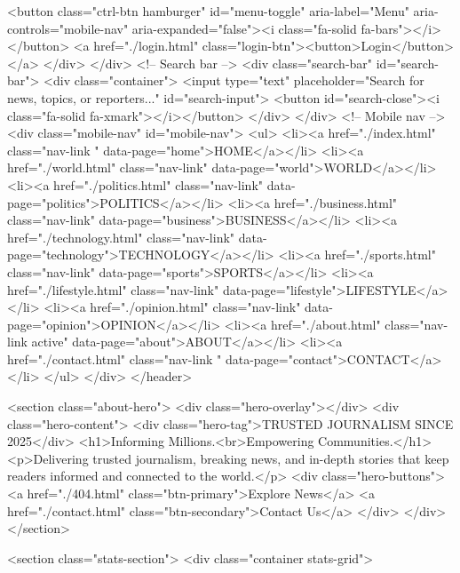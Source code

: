                 <button class="ctrl-btn hamburger" id="menu-toggle" aria-label="Menu" aria-controls="mobile-nav"
                    aria-expanded="false"><i class="fa-solid fa-bars"></i></button>
                <a href="./login.html" class="login-btn"><button>Login</button></a>
            </div>
        </div>
        <!-- Search bar -->
        <div class="search-bar" id="search-bar">
            <div class="container">
                <input type="text" placeholder="Search for news, topics, or reporters..." id="search-input">
                <button id="search-close"><i class="fa-solid fa-xmark"></i></button>
            </div>
        </div>
        <!-- Mobile nav -->
        <div class="mobile-nav" id="mobile-nav">
            <ul>
                <li><a href="./index.html" class="nav-link " data-page="home">HOME</a></li>
                <li><a href="./world.html" class="nav-link" data-page="world">WORLD</a></li>
                <li><a href="./politics.html" class="nav-link" data-page="politics">POLITICS</a></li>
                <li><a href="./business.html" class="nav-link" data-page="business">BUSINESS</a></li>
                <li><a href="./technology.html" class="nav-link" data-page="technology">TECHNOLOGY</a></li>
                <li><a href="./sports.html" class="nav-link" data-page="sports">SPORTS</a></li>
                <li><a href="./lifestyle.html" class="nav-link" data-page="lifestyle">LIFESTYLE</a></li>
                <li><a href="./opinion.html" class="nav-link" data-page="opinion">OPINION</a></li>
                <li><a href="./about.html" class="nav-link active" data-page="about">ABOUT</a></li>
                <li><a href="./contact.html" class="nav-link " data-page="contact">CONTACT</a></li>
            </ul>
        </div>
    </header>

<section class="about-hero">
        <div class="hero-overlay"></div>
        <div class="hero-content">
            <div class="hero-tag">TRUSTED JOURNALISM SINCE 2025</div>
            <h1>Informing Millions.<br>Empowering Communities.</h1>
            <p>Delivering trusted journalism, breaking news, and in-depth stories that keep readers informed and connected to the world.</p>
            <div class="hero-buttons">
                <a href="./404.html" class="btn-primary">Explore News</a>
                <a href="./contact.html" class="btn-secondary">Contact Us</a>
            </div>
        </div>
    </section>

    <section class="stats-section">
    <div class="container stats-grid">

